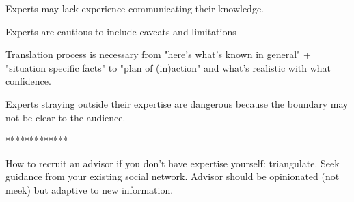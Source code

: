 Experts may lack experience communicating their knowledge. 

Experts are cautious to include caveats and limitations

Translation process is necessary from "here's what's known in general" + "situation specific facts" to "plan of (in)action" and what's realistic with what confidence. 

Experts straying outside their expertise are dangerous because the boundary may not be clear to the audience.

*************

How to recruit an advisor if you don't have expertise yourself: triangulate. Seek guidance from your existing social network. Advisor should be opinionated (not meek) but adaptive to new information. 